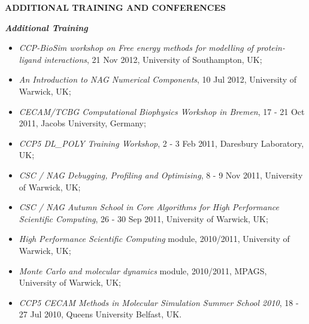 \documentclass[a4paper,10pt,final]{memoir}
\newcommand{\Sep}{\vspace{1.5em}}
\newcommand{\SmallSep}{\vspace{0.5em}}
\newcommand{\CVSection}[1]
	{\Large\textbf{#1}\par
	\SmallSep\normalsize\normalfont}
\newcommand{\CVItem}[2]
	{\textit{\textbf{\color{RoyalBlue} #1}} #2}
\begin{document}
\Sep
\CVSection{ADDITIONAL TRAINING AND CONFERENCES} 
\CVItem{Additional Training} 
\begin{itemize} \itemsep -2pt %
\item \textit{CCP-BioSim workshop on Free energy methods for modelling of protein-ligand
  interactions}, 21 Nov 2012, University of Southampton, UK;
\item \textit{An Introduction to NAG Numerical Components}, 10 Jul 2012, University of Warwick, UK;
\item \textit{CECAM/TCBG Computational Biophysics Workshop in Bremen},  17 - 21 Oct 2011, Jacobs University, Germany;  
\item \textit{CCP5 DL\_POLY Training Workshop}, 2 - 3 Feb 2011, Daresbury
Laboratory, UK;
\item \textit{CSC / NAG Debugging, Profiling and Optimising},  8 - 9 Nov 2011, University of
  Warwick, UK;
\item \textit{CSC / NAG Autumn School in Core Algorithms for High Performance Scientific
  Computing}, 26 - 30 Sep 2011, University of Warwick, UK;
\item \textit{High Performance Scientific Computing} module, 2010/2011, University of Warwick, UK;
\item \textit{Monte Carlo and molecular dynamics} module, 2010/2011, MPAGS, University of Warwick, UK;
\item \textit{CCP5 CECAM Methods in Molecular Simulation Summer School 2010}, 18 - 27 Jul 2010, Queens University
  Belfast, UK.
\end{itemize}
\SmallSep
\end{document}
